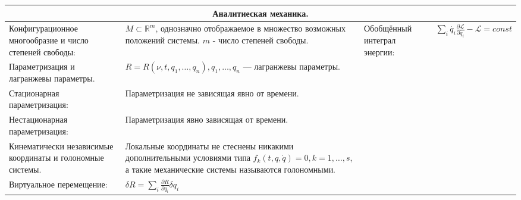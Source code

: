 \documentclass{article}
\begin{document}
\newpage
\begin{tabular}{ |p{3.8cm}|p{5.7cm}|p{6cm}|p{3.5cm}|  }
\hline
\multicolumn{4}{|c|}{Аналитиеская механика.} \\
\hline
Конфигурационное многообразие и число степеней свободы:                      &  %
$M \subset \mathbb{R}^m$, однозначно отображаемое в множество возможных
 положений системы. $m$ - число степеней свободы.                            &  %
Обобщённый интеграл энергии:                                                 &  %
$\sum_i {\dot{q_i} \frac{\partial \mathcal{L}}{\partial \dot{q_i}}} -
 \mathcal{L} = const$                                       \\ %
\hline
Параметризация и лагранжевы параметры.                                       &  %
$R = R(\nu, t, q_1, \dots, q_n), q_1, \dots, q_n$ --- лагранжевы параметры.  &  %
                                                                             &  %
                                                                             \\ %
\hline
Стационарная параметризация:                                                 &  %
Параметризация не зависящая явно от времени.                                 &  %
                                                                             &  %
                                                                             \\ %
\hline
Нестационарная параметризация:                                               &  %
Параметризация явно зависящая от времени.                                    &  %
                                                                             &  %
                                                                             \\ %
\hline
Кинематически независимые координаты и голономные системы.                   &  %
Локальные координаты не стеснены никакими дополнительными условиями типа
$f_k(t, q, \dot{q}) = 0, k = 1, \dots, s$, а такие механические системы
называются голономными.                                                      &  %
                                                                             &  %
                                                                             \\ %
\hline
Виртуальное перемещение:                                                     &  %
$\delta R = \sum_i{\frac{\partial R}{\partial q_i} \delta q_i}$              &  %

\end{tabular}
\end{document}
